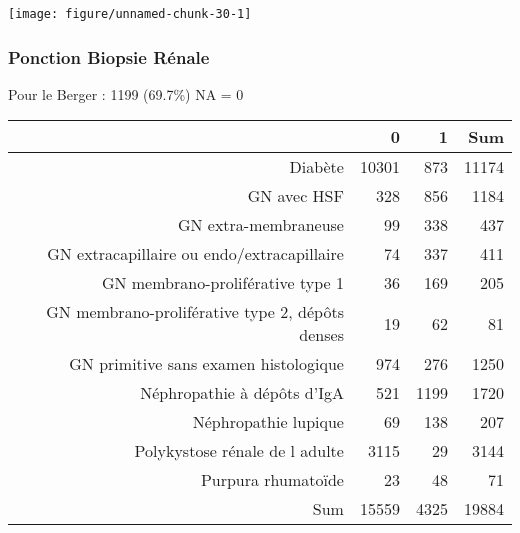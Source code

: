 \documentclass[11pt,a4paper]{article}\usepackage[]{graphicx}\usepackage[]{color}
\makeatletter
\def\maxwidth{ %
  \ifdim\Gin@nat@width>\linewidth
    \linewidth
  \else
    \Gin@nat@width
  \fi
}
\newenvironment{knitrout}{}{} %
\makeatother
\begin{document}
\begin{knitrout}
\color{fgcolor}
\texttt{[image: figure/unnamed-chunk-30-1]} 

\end{knitrout}

      \subsubsection{Ponction Biopsie Rénale}

Pour le Berger : 1199 (69.7\%) NA = 0

\begin{table}[H]
\centering
\begin{tabular}{rrrr}
  \hline
 & 0 & 1 & Sum \\ 
  \hline
Diabète & 10301 & 873 & 11174 \\ 
  GN avec HSF & 328 & 856 & 1184 \\ 
  GN extra-membraneuse & 99 & 338 & 437 \\ 
  GN extracapillaire ou endo/extracapillaire & 74 & 337 & 411 \\ 
  GN membrano-proliférative type 1 & 36 & 169 & 205 \\ 
  GN membrano-proliférative type 2, dépôts denses & 19 & 62 & 81 \\ 
  GN primitive sans examen histologique & 974 & 276 & 1250 \\ 
  Néphropathie à dépôts d'IgA & 521 & 1199 & 1720 \\ 
  Néphropathie lupique & 69 & 138 & 207 \\ 
  Polykystose rénale de l adulte & 3115 & 29 & 3144 \\ 
  Purpura rhumatoïde & 23 & 48 & 71 \\ 
  Sum & 15559 & 4325 & 19884 \\ 
   \hline
\end{tabular}
\end{table}
\end{document}
